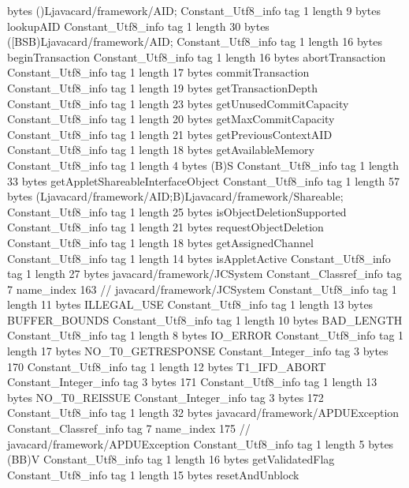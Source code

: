 {{{			bytes	()Ljavacard/framework/AID;
		}
		Constant_Utf8_info {
			tag	1
			length	9
			bytes	lookupAID
		}
		Constant_Utf8_info {
			tag	1
			length	30
			bytes	([BSB)Ljavacard/framework/AID;
		}
		Constant_Utf8_info {
			tag	1
			length	16
			bytes	beginTransaction
		}
		Constant_Utf8_info {
			tag	1
			length	16
			bytes	abortTransaction
		}
		Constant_Utf8_info {
			tag	1
			length	17
			bytes	commitTransaction
		}
		Constant_Utf8_info {
			tag	1
			length	19
			bytes	getTransactionDepth
		}
		Constant_Utf8_info {
			tag	1
			length	23
			bytes	getUnusedCommitCapacity
		}
		Constant_Utf8_info {
			tag	1
			length	20
			bytes	getMaxCommitCapacity
		}
		Constant_Utf8_info {
			tag	1
			length	21
			bytes	getPreviousContextAID
		}
		Constant_Utf8_info {
			tag	1
			length	18
			bytes	getAvailableMemory
		}
		Constant_Utf8_info {
			tag	1
			length	4
			bytes	(B)S
		}
		Constant_Utf8_info {
			tag	1
			length	33
			bytes	getAppletShareableInterfaceObject
		}
		Constant_Utf8_info {
			tag	1
			length	57
			bytes	(Ljavacard/framework/AID;B)Ljavacard/framework/Shareable;
		}
		Constant_Utf8_info {
			tag	1
			length	25
			bytes	isObjectDeletionSupported
		}
		Constant_Utf8_info {
			tag	1
			length	21
			bytes	requestObjectDeletion
		}
		Constant_Utf8_info {
			tag	1
			length	18
			bytes	getAssignedChannel
		}
		Constant_Utf8_info {
			tag	1
			length	14
			bytes	isAppletActive
		}
		Constant_Utf8_info {
			tag	1
			length	27
			bytes	javacard/framework/JCSystem
		}
		Constant_Classref_info {
			tag	7
			name_index	163		// javacard/framework/JCSystem
		}
		Constant_Utf8_info {
			tag	1
			length	11
			bytes	ILLEGAL_USE
		}
		Constant_Utf8_info {
			tag	1
			length	13
			bytes	BUFFER_BOUNDS
		}
		Constant_Utf8_info {
			tag	1
			length	10
			bytes	BAD_LENGTH
		}
		Constant_Utf8_info {
			tag	1
			length	8
			bytes	IO_ERROR
		}
		Constant_Utf8_info {
			tag	1
			length	17
			bytes	NO_T0_GETRESPONSE
		}
		Constant_Integer_info {
			tag	3
			bytes	170
		}
		Constant_Utf8_info {
			tag	1
			length	12
			bytes	T1_IFD_ABORT
		}
		Constant_Integer_info {
			tag	3
			bytes	171
		}
		Constant_Utf8_info {
			tag	1
			length	13
			bytes	NO_T0_REISSUE
		}
		Constant_Integer_info {
			tag	3
			bytes	172
		}
		Constant_Utf8_info {
			tag	1
			length	32
			bytes	javacard/framework/APDUException
		}
		Constant_Classref_info {
			tag	7
			name_index	175		// javacard/framework/APDUException
		}
		Constant_Utf8_info {
			tag	1
			length	5
			bytes	(BB)V
		}
		Constant_Utf8_info {
			tag	1
			length	16
			bytes	getValidatedFlag
		}
		Constant_Utf8_info {
			tag	1
			length	15
			bytes	resetAndUnblock
}}}
